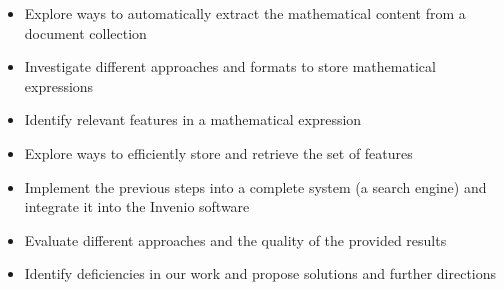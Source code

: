 \begin{itemize}
\item Explore ways to automatically extract the mathematical content from a document collection
\item Investigate different approaches and formats to store mathematical expressions
\item Identify relevant features in a mathematical expression 
\item Explore ways to efficiently store and retrieve the set of features
\item Implement the previous steps into a complete system (a search engine) and integrate it into the Invenio software
\item Evaluate different approaches and the quality of the provided results
\item Identify deficiencies in our work and propose solutions and further directions
\end{itemize}
